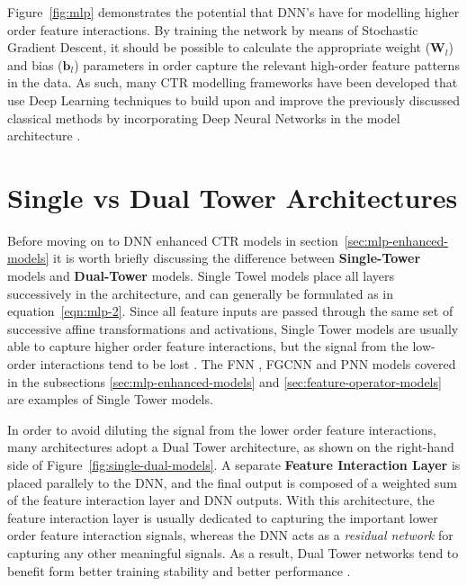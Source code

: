 \documentclass{mldsmsc}
\begin{document}
Figure~\ref{fig:mlp} demonstrates the potential that DNN's have for modelling higher order feature
interactions. By training the network by means of Stochastic Gradient Descent, it should be
possible to calculate the appropriate weight ($\mathbf{W}_l$) and bias ($\mathbf{b}_l$) parameters
in order capture the relevant high-order feature patterns in the data. As such, many CTR
modelling frameworks have been developed that use Deep Learning techniques to build upon and
improve the previously discussed classical methods by incorporating Deep Neural
Networks in the model architecture \citep{RefWorks:zhang2021deep}.

\section{Single vs Dual Tower Architectures}

Before moving on to DNN enhanced CTR models in section~\ref{sec:mlp-enhanced-models}
it is worth briefly discussing the difference between \textbf{Single-Tower}
models and \textbf{Dual-Tower} models. Single Towel models place
all layers successively in the architecture, and can generally be formulated
as in equation~\ref{eqn:mlp-2}. Since all feature inputs are passed through
the same set of successive affine transformations and activations, Single Tower
models are usually able to capture higher order feature interactions, but the signal
from the low-order interactions tend to be lost \citep{RefWorks:zhang2021deep}.
The FNN \citep{RefWorks:zhang2016deep}, FGCNN
\citep{RefWorks:liu2019feature} and PNN \citep{RefWorks:qu2016product-based} models covered in the subsections 
\ref{sec:mlp-enhanced-models} and \ref{sec:feature-operator-models}
are examples of Single Tower models.

In order to avoid diluting the signal from the lower order feature interactions, many architectures
adopt a Dual Tower architecture, as shown on the right-hand side of
Figure~\ref{fig:single-dual-models}. A separate \textbf{Feature Interaction Layer}
is placed parallely to the DNN, and the final output is composed of a weighted sum
of the feature interaction layer and DNN outputs. With this architecture, the feature interaction
layer is usually dedicated to capturing the important lower order feature interaction signals,
whereas the DNN acts as a \emph{residual network} for capturing any other meaningful signals. 
As a result, Dual Tower networks tend to benefit form better training stability and
better performance \citep{RefWorks:zhang2021deep}.
\end{document}
